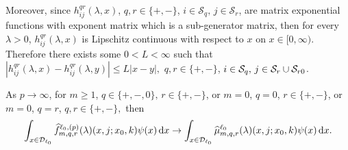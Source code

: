 Moreover, since \(h_{ij}^{qr}(\lambda,x)\), \(q,r\in \{+,-\}\), \(i\in\mathcal S_q,\,j\in\mathcal S_r\), are matrix exponential functions with exponent matrix which is a sub-generator matrix, then for every \(\lambda >0\), \(h_{ij}^{qr}(\lambda,x)\) is Lipschitz continuous with respect to \(x\) on \(x\in[0,\infty)\). Therefore there exists some \(0<L<\infty\) such that \(\left|h_{ij}^{qr}(\lambda,x)-h_{ij}^{qr}(\lambda,y)\right|\leq L|x-y|,\) \(q,r\in \{+,-\}\), \(i\in\mathcal S_q,\,j\in\mathcal S_r\cup\mathcal{S}_{r0}\).

\begin{thm}\label{thm: a thm!}
	As \(p\to \infty\), for \(m\geq 1\), \(q\in\{+,-,0\},\, r\in\{+,-\}\), or \(m=0\), \(q=0\), \(r\in\{+,-\}\), or \(m=0\), \(q=r\), \(q,r\in\{+,-\},\) then
	\begin{align}\int_{x\in\mathcal{D}_{\ell_0}}\widehat f_{m,q,r}^{\ell_0,(p)}(\lambda)(x,j;x_0,k)\psi(x)\, \mathrm{d} x \to \int_{x\in\mathcal{D}_{\ell_0}}\widehat \mu_{m,q,r}^{\ell_0}(\lambda)(x,j;x_0,k)\psi(x)\, \mathrm{d} x.\label{eqn: thm 2}\end{align}
\end{thm}
